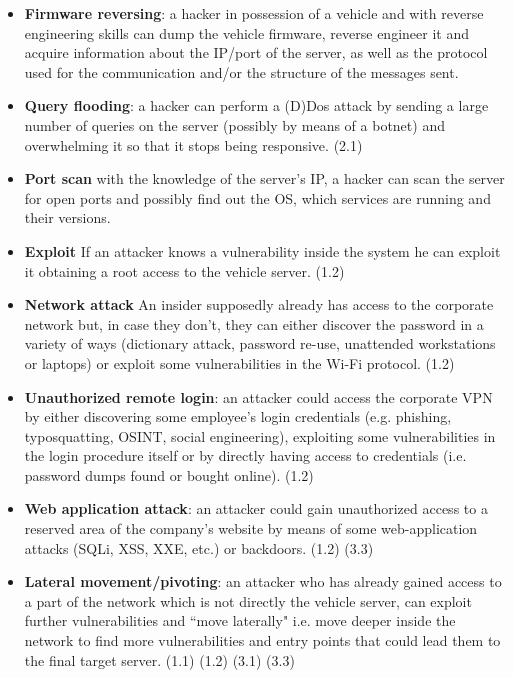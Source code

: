 \begin{itemize}
	\item \textbf{Firmware reversing}: a hacker in possession of a vehicle and with reverse engineering skills can dump the vehicle firmware, reverse engineer it and acquire information about the IP/port of the server, as well as the protocol used for the communication and/or the structure of the messages sent.
	
	\item \textbf{Query flooding}: a hacker can perform a (D)Dos attack by sending a large number of queries on the server (possibly by means of a botnet) and overwhelming it so that it stops being responsive. (2.1)
	
	\item \textbf{Port scan} with the knowledge of the server's IP, a hacker can scan the server for open ports and possibly find out the OS, which services are running and their versions. 
	
	\item \textbf{Exploit} If an attacker knows a vulnerability inside the system he can exploit it obtaining a root access to the vehicle server. (1.2) 
	
	\item \textbf{Network attack} An insider supposedly already has access to the corporate network but, in case they don't, they can either discover the password in a variety of ways (dictionary attack, password re-use, unattended workstations or laptops) or exploit some vulnerabilities in the Wi-Fi protocol. (1.2)
	
	\item \textbf{Unauthorized remote login}: an attacker could access the corporate VPN by either discovering some employee's login credentials (e.g. phishing, typosquatting, OSINT, social engineering), exploiting some vulnerabilities  in the login procedure itself or by directly having access to credentials (i.e. password dumps found or bought online). (1.2)
	
	\item \textbf{Web application attack}: an attacker could gain unauthorized access to a reserved area of the company's website by means of some web-application attacks (SQLi, XSS, XXE, etc.) or backdoors. (1.2) (3.3)
	
	\item \textbf{Lateral movement/pivoting}: an attacker who has already gained access to a part of the network which is not directly the vehicle server, can exploit further vulnerabilities and ``move laterally" i.e. move deeper inside the network to find more vulnerabilities and entry points that could lead them to the final target server. (1.1) (1.2) (3.1) (3.3)
	

\end{itemize}
